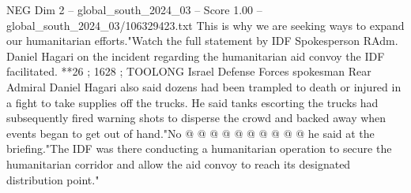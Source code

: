 \begin{textsample}{NEG Dim 2 – global\_south\_2024\_03 – Score 1.00 – global\_south\_2024\_03/106329423.txt}
This is why we are seeking ways to expand our humanitarian efforts."Watch the full statement by IDF Spokesperson RAdm.
Daniel Hagari on the incident regarding the humanitarian aid convoy the IDF facilitated. **26 ; 1628 ; TOOLONG Israel Defense Forces spokesman Rear Admiral Daniel Hagari also said dozens had been trampled to death or injured in a fight to take supplies off the trucks.
He said tanks escorting the trucks had subsequently fired warning shots to disperse the crowd and backed away when events began to get out of hand."No @ @ @ @ @ @ @ @ @ @ he said at the briefing."The IDF was there conducting a humanitarian operation to secure the humanitarian corridor and allow the aid convoy to reach its designated distribution point."

\end{textsample}
